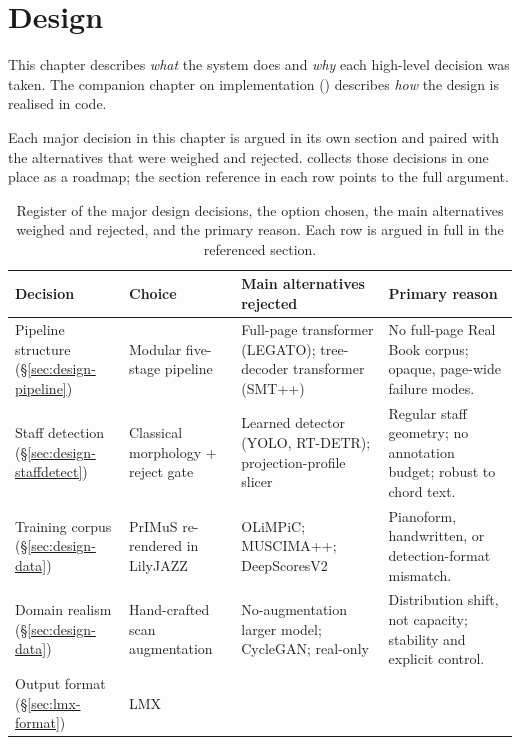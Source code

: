 \chapter{Design}
\label{ch:design}

This chapter describes \textit{what} the system does and \textit{why} each
high-level decision was taken.
The companion chapter on implementation () describes
\textit{how} the design is realised in code.

Each major decision in this chapter is argued in its own section and
paired with the alternatives that were weighed and rejected.
 collects those decisions in one place as
a roadmap; the section reference in each row points to the full
argument.

\begin{table}[ht]
\centering
\caption[Design-decision register.]{%
Register of the major design decisions, the option chosen, the main
alternatives weighed and rejected, and the primary reason. Each row is
argued in full in the referenced section.}
\label{tab:decision-register}
\scriptsize
\setlength{\tabcolsep}{4pt}
\renewcommand{\arraystretch}{1.25}
\begin{tabularx}{\linewidth}{@{} >{\raggedright\arraybackslash}p{2.5cm} >{\raggedright\arraybackslash}p{2.4cm} L L @{}}
\toprule
\textbf{Decision} & \textbf{Choice} & \textbf{Main alternatives rejected} & \textbf{Primary reason} \\
\midrule
Pipeline structure (\S\ref{sec:design-pipeline})
  & Modular five-stage pipeline
  & Full-page transformer (LEGATO); tree-decoder transformer (SMT++)
  & No full-page Real Book corpus; opaque, page-wide failure modes. \\
\tfgrowsep
Staff detection (\S\ref{sec:design-staffdetect})
  & Classical morphology + reject gate
  & Learned detector (YOLO, RT-DETR); projection-profile slicer
  & Regular staff geometry; no annotation budget; robust to chord text. \\
\tfgrowsep
Training corpus (\S\ref{sec:design-data})
  & PrIMuS re-rendered in LilyJAZZ
  & OLiMPiC; MUSCIMA++; DeepScoresV2
  & Pianoform, handwritten, or detection-format mismatch. \\
\tfgrowsep
Domain realism (\S\ref{sec:design-data})
  & Hand-crafted scan augmentation
  & No-augmentation larger model; CycleGAN; real-only
  & Distribution shift, not capacity; stability and explicit control. \\
\tfgrowsep
Output format (\S\ref{sec:lmx-format})
  & LMX

\end{tabularx}
\end{table}
